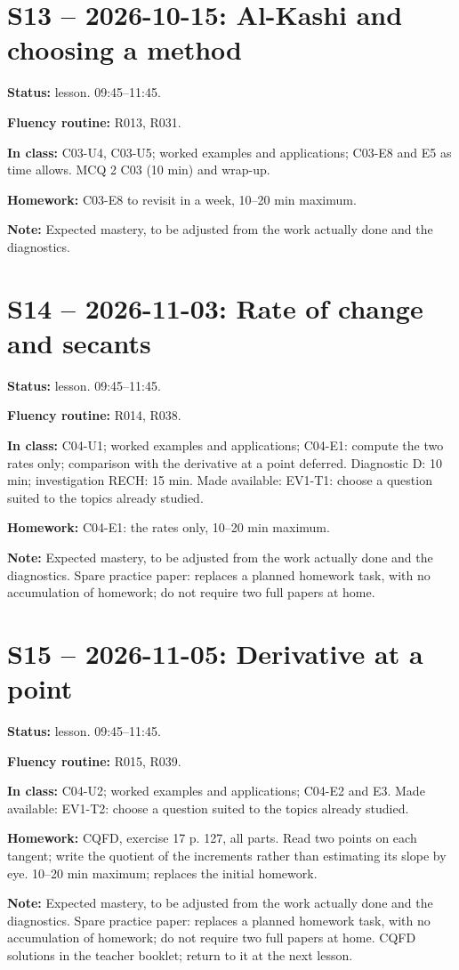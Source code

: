 \section*{S13 -- 2026-10-15: Al-Kashi and choosing a method}
\textbf{Status:} lesson. 09:45–11:45.\par\textbf{Fluency routine:} R013, R031.\par\textbf{In class:} C03-U4, C03-U5; worked examples and applications; C03-E8 and E5 as time allows.  MCQ 2 C03 (10 min) and wrap-up.\par\textbf{Homework:} C03-E8 to revisit in a week, 10–20 min maximum.\par\textbf{Note:} Expected mastery, to be adjusted from the work actually done and the diagnostics.
\section*{S14 -- 2026-11-03: Rate of change and secants}
\textbf{Status:} lesson. 09:45–11:45.\par\textbf{Fluency routine:} R014, R038.\par\textbf{In class:} C04-U1; worked examples and applications; C04-E1: compute the two rates only; comparison with the derivative at a point deferred. Diagnostic D: 10 min; investigation RECH: 15 min. Made available: EV1-T1: choose a question suited to the topics already studied.\par\textbf{Homework:} C04-E1: the rates only, 10–20 min maximum.\par\textbf{Note:} Expected mastery, to be adjusted from the work actually done and the diagnostics. Spare practice paper: replaces a planned homework task, with no accumulation of homework; do not require two full papers at home.
\section*{S15 -- 2026-11-05: Derivative at a point}
\textbf{Status:} lesson. 09:45–11:45.\par\textbf{Fluency routine:} R015, R039.\par\textbf{In class:} C04-U2; worked examples and applications; C04-E2 and E3.  Made available: EV1-T2: choose a question suited to the topics already studied.\par\textbf{Homework:} CQFD, exercise 17 p. 127, all parts. Read two points on each tangent; write the quotient of the increments rather than estimating its slope by eye. 10–20 min maximum; replaces the initial homework.\par\textbf{Note:} Expected mastery, to be adjusted from the work actually done and the diagnostics. Spare practice paper: replaces a planned homework task, with no accumulation of homework; do not require two full papers at home. CQFD solutions in the teacher booklet; return to it at the next lesson.
